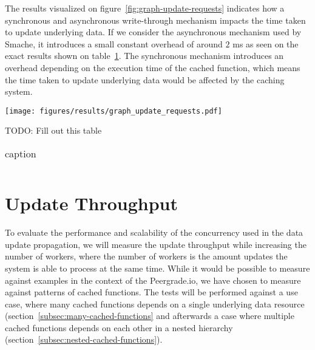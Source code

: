 The results visualized on figure~\ref{fig:graph-update-requests} indicates how a synchronous and asynchronous write-through mechanism impacts the time taken to update underlying data. If we consider the asynchronous mechanism used by Smache, it introduces a small constant overhead of around $2$ ms as seen on the exact results shown on table~\ref{tab:update-requests}. The synchronous mechanism introduces an overhead depending on the execution time of the cached function, which means the time taken to update underlying data would be affected by the caching system.

\begin{figure*}[ht!]
  \centering
  \texttt{[image: figures/results/graph\_update\_requests.pdf]}
  \caption{Impact of introducing synchronous and asynchronous write-through in a case, where the update affects a single cached object instance with variable execution time.}
  \label{fig:graph-update-requests}
\end{figure*}

TODO: Fill out this table

\begin{table}[htpb]
  \centering
  \caption{caption}
  \label{tab:update-requests}
  \begin{tabular}{c}

  \end{tabular}
\end{table}


\section{Update Throughput}
\label{sec:update-throughput}

To evaluate the performance and scalability of the concurrency used in the data update propagation, we will measure the update throughput while increasing the number of workers, where the number of workers is the amount updates the system is able to process at the same time. While it would be possible to measure against examples in the context of the Peergrade.io, we have chosen to measure against patterns of cached functions. The tests will be performed against a use case, where many cached functions depends on a single underlying data resource (section~\ref{subsec:many-cached-functions} and afterwards a case where multiple cached functions depends on each other in a nested hierarchy (section~\ref{subsec:nested-cached-functions}).

